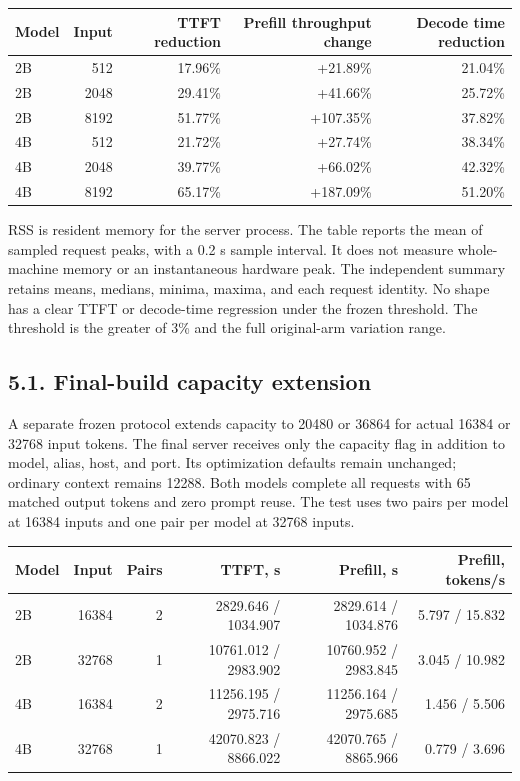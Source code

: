 \documentclass[10pt,a4paper]{article}
\begin{document}
\begin{longtable}[]{@{}lrrrr@{}}
\toprule
Model & Input & TTFT reduction & Prefill throughput change & Decode time
reduction\tabularnewline
\midrule
\endhead
2B & 512 & 17.96\% & +21.89\% & 21.04\%\tabularnewline
2B & 2048 & 29.41\% & +41.66\% & 25.72\%\tabularnewline
2B & 8192 & 51.77\% & +107.35\% & 37.82\%\tabularnewline
4B & 512 & 21.72\% & +27.74\% & 38.34\%\tabularnewline
4B & 2048 & 39.77\% & +66.02\% & 42.32\%\tabularnewline
4B & 8192 & 65.17\% & +187.09\% & 51.20\%\tabularnewline
\bottomrule
\end{longtable}

RSS is resident memory for the server process. The table reports the
mean of sampled request peaks, with a 0.2 s sample interval. It does not
measure whole-machine memory or an instantaneous hardware peak. The
independent summary retains means, medians, minima, maxima, and each
request identity. No shape has a clear TTFT or decode-time regression
under the frozen threshold. The threshold is the greater of 3\% and the
full original-arm variation range.

\hypertarget{final-build-capacity-extension}{%
\subsection{5.1. Final-build capacity
extension}\label{final-build-capacity-extension}}

A separate frozen protocol extends capacity to 20480 or 36864 for actual
16384 or 32768 input tokens. The final server receives only the capacity
flag in addition to model, alias, host, and port. Its optimization
defaults remain unchanged; ordinary context remains 12288. Both models
complete all requests with 65 matched output tokens and zero prompt
reuse. The test uses two pairs per model at 16384 inputs and one pair
per model at 32768 inputs.

\begin{longtable}[]{@{}lrrrrr@{}}
\toprule
Model & Input & Pairs & TTFT, s & Prefill, s & Prefill,
tokens/s\tabularnewline
\midrule
\endhead
2B & 16384 & 2 & 2829.646 / 1034.907 & 2829.614 / 1034.876 & 5.797 /
15.832\tabularnewline
2B & 32768 & 1 & 10761.012 / 2983.902 & 10760.952 / 2983.845 & 3.045 /
10.982\tabularnewline
4B & 16384 & 2 & 11256.195 / 2975.716 & 11256.164 / 2975.685 & 1.456 /
5.506\tabularnewline
4B & 32768 & 1 & 42070.823 / 8866.022 & 42070.765 / 8865.966 & 0.779 /
3.696\tabularnewline
\bottomrule
\end{longtable}
\end{document}
